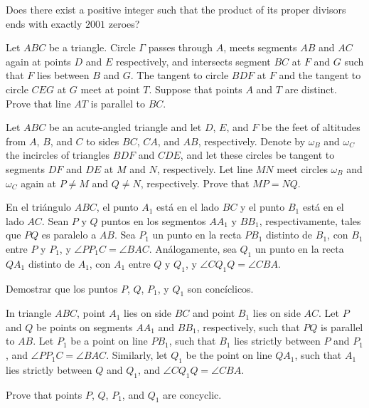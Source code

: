 
\begin{probEG}[Russia 2001]
  Does there exist a positive integer such that the product of its proper
  divisors ends with exactly $2001$ zeroes?
\end{probEG}


\begin{probEG}[ISL 2019/G1]
  Let $ABC$ be a triangle. Circle $\Gamma$ passes through $A$, meets segments
  $AB$ and $AC$ again at points $D$ and $E$ respectively, and intersects segment
  $BC$ at $F$ and $G$ such that $F$ lies between $B$ and $G$. The tangent to
  circle $BDF$ at $F$ and the tangent to circle $CEG$ at $G$ meet at point $T$.
  Suppose that points $A$ and $T$ are distinct. Prove that line $AT$ is parallel
  to $BC$.
\end{probEG}

\begin{probEG}[ISL 2019/G2]
  Let $ABC$ be an acute-angled triangle and let $D$, $E$, and $F$ be the feet of
  altitudes from $A$, $B$, and $C$ to sides $BC$, $CA$, and $AB$, respectively.
  Denote by $\omega_B$ and $\omega_C$ the incircles of triangles $BDF$ and
  $CDE$, and let these circles be tangent to segments $DF$ and $DE$ at $M$ and
  $N$, respectively. Let line $MN$ meet circles $\omega_B$ and $\omega_C$ again
  at $P\ne M$ and $Q\ne N$, respectively. Prove that $MP=NQ$.
\end{probEG}

\begin{probMG}
  En el triángulo $ABC$, el punto $A_1$ está en el lado $BC$ y el punto $B_1$
  está en el lado $AC$. Sean $P$ y $Q$ puntos en los segmentos $AA_1$ y $BB_1$,
  respectivamente, tales que $PQ$ es paralelo a $AB$. Sea $P_1$ un punto en la
  recta $PB_1$ distinto de $B_1$, con $B_1$ entre $P$ y $P_1$, y
  $\angle PP_1C=\angle BAC$. Análogamente, sea $Q_1$ un punto en la recta $QA_1$
  distinto de $A_1$, con $A_1$ entre $Q$ y $Q_1$, y $\angle CQ_1Q=\angle CBA$.

  Demostrar que los puntos $P$, $Q$, $P_1$, y $Q_1$ son concíclicos.
  \begin{hint}
    In triangle $ABC$, point $A_1$ lies on side $BC$ and point $B_1$ lies on
    side $AC$. Let $P$ and $Q$ be points on segments $AA_1$ and $BB_1$,
    respectively, such that $PQ$ is parallel to $AB$. Let $P_1$ be a point on
    line $PB_1$, such that $B_1$ lies strictly between $P$ and $P_1$, and
    $\angle PP_1C=\angle BAC$. Similarly, let $Q_1$ be the point on line $QA_1$,
    such that $A_1$ lies strictly between $Q$ and $Q_1$, and
    $\angle CQ_1Q=\angle CBA$.

    Prove that points $P$, $Q$, $P_1$, and $Q_1$ are concyclic.
  \end{hint}
\end{probMG}

